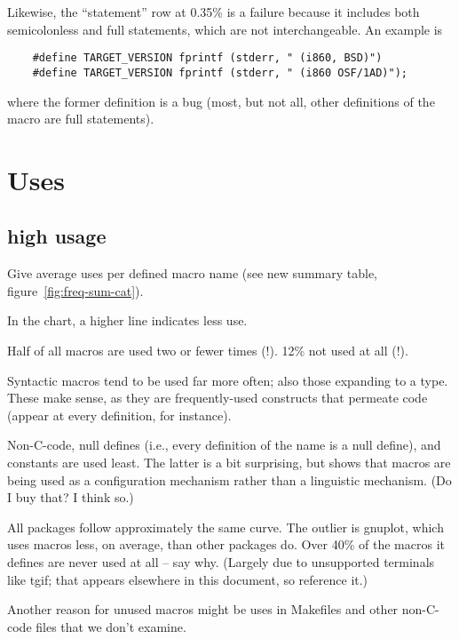 \documentclass[10pt]{article}
\newcommand{\pkg}[1]{\textsf{#1}}
\begin{document}
Likewise, the ``statement'' row at 0.35\% is a failure because it includes
both semicolonless and full statements, which are not interchangeable.  An
example is
\begin{verbatim}
    #define TARGET_VERSION fprintf (stderr, " (i860, BSD)")
    #define TARGET_VERSION fprintf (stderr, " (i860 OSF/1AD)");
\end{verbatim}
where the former definition is a bug (most, but not all, other definitions
of the macro are full statements).




\section{Uses}

\subsection{high usage}

        Give average uses per defined macro name (see new summary table, figure~\ref{fig:freq-sum-cat}).

        In the chart, a higher line indicates less use.

        Half of all macros are used two or fewer times (!).  12\% not used
          at all (!).

        Syntactic macros tend to be used far more often; also those
          expanding to a type.  These make sense, as they are
          frequently-used constructs 
          that permeate code (appear at every definition, for instance).

        Non-C-code, null defines (i.e., every definition of the name is a
          null define), and constants are used least.  The latter is a bit
          surprising, but shows that macros are being used as a
          configuration mechanism rather than a linguistic mechanism.  (Do
          I buy that?  I think so.)

        All packages follow approximately the same curve.  The outlier is
          \pkg{gnuplot}, which uses macros less, on average, than other packages
          do.  Over 40\% of the macros it defines are never used at all --
          say why.  (Largely due to unsupported terminals like tgif; that
          appears elsewhere in this document, so reference it.)

          Another reason for unused macros might be uses in Makefiles and
          other non-C-code files that we don't examine.
\end{document}
